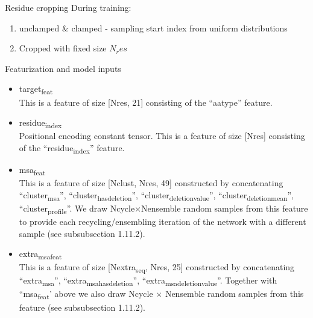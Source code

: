 \documentclass[presentation, smaller]{beamer}
\begin{document}
\begin{frame}[label={sec:orgc5d6117}]{Residue cropping \cite{jumperHighlyAccurateProtein2021}}
During training:
\begin{enumerate}
\item unclamped \& clamped - sampling start index from uniform distributions
\item Cropped with fixed size \(N_res\)
\end{enumerate}
\end{frame}

\begin{frame}[label={sec:orgc1cec96}]{Featurization and model inputs \cite{jumperHighlyAccurateProtein2021}}
\begin{itemize}
\item \alert{target\textsubscript{feat}} \\
This is a feature of size [Nres, 21] consisting of the “aatype” feature.
\item \alert{residue\textsubscript{index}} \\
Positional encoding constant tensor. This is a feature of size [Nres] consisting of the “residue\textsubscript{index}” feature.
\item \alert{msa\textsubscript{feat}} \\
This is a feature of size [Nclust, Nres, 49] constructed by concatenating “cluster\textsubscript{msa}”, “cluster\textsubscript{has}\textsubscript{deletion}”, “cluster\textsubscript{deletion}\textsubscript{value}”, “cluster\textsubscript{deletion}\textsubscript{mean}”, “cluster\textsubscript{profile}”. We draw Ncycle×Nensemble random samples from this feature to provide each recycling/ensembling iteration of the network with a different sample (see subsubsection 1.11.2).
\item \alert{extra\textsubscript{msa}\textsubscript{feat}} \\
This is a feature of size [Nextra\textsubscript{seq}, Nres, 25] constructed by concatenating “extra\textsubscript{msa}”, “extra\textsubscript{msa}\textsubscript{has}\textsubscript{deletion}”, “extra\textsubscript{msa}\textsubscript{deletion}\textsubscript{value}”. Together with “msa\textsubscript{feat}’ above we also draw Ncycle × Nensemble random samples from this feature (see subsubsection 1.11.2).
\end{itemize}
\end{frame}
\end{document}
